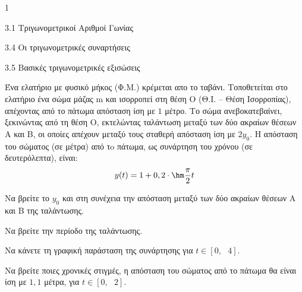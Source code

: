 \begin{ylh}{1}
\item 3.1 Τριγωνομετρικοί Αριθμοί Γωνίας
\item 3.4 Οι τριγωνομετρικές συναρτήσεις
\item 3.5 Βασικές τριγωνομετρικές εξισώσεις
\end{ylh}
\begin{center}
\end{center}
Ένα ελατήριο με φυσικό μήκος (Φ.Μ.) κρέμεται απο το ταβάνι. Τοποθετείται στο ελατήριο ένα σώμα μάζας m και ισορροπεί στη θέση Ο (Θ.Ι. -- Θέση Ισορροπίας), απέχοντας από το πάτωμα απόσταση ίση με $1$ μέτρο.
Το σώμα ανεβοκατεβαίνει, ξεκινώντας από τη θέση Ο, εκτελώντας ταλάντωση μεταξύ των δύο ακραίων θέσεων Α και Β, οι οποίες απέχουν μεταξύ τους σταθερή απόσταση ίση με $2y_{0}$.
Η απόσταση του σώματος (σε μέτρα) από τo πάτωμα, ως συνάρτηση του χρόνου (σε δευτερόλεπτα), είναι:
\begin{equation*}y(t) = 1 + 0,2 \cdot \hm \frac{\pi}{2}t\end{equation*}
\begin{alist}
\item Να βρείτε το $y_{0}$ και στη συνέχεια την απόσταση μεταξύ των δύο ακραίων θέσεων Α και Β της ταλάντωσης.
\item Να βρείτε την περίοδο της ταλάντωσης.
\item Να κάνετε τη γραφική παράσταση της συνάρτησης για $t \in \left\lbrack 0,\text{ }4 \right\rbrack$.
\item Να βρείτε ποιες χρονικές στιγμές, η απόσταση του σώματος από το πάτωμα θα είναι ίση με $1,1$ μέτρα, για $t \in \left\lbrack 0,\text{ }2 \right\rbrack$.
\end{alist}

